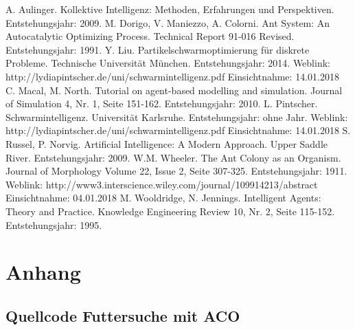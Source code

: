 \documentclass[a4paper, 11pt]{article}
\makeatletter
\newcommand*{\appendixtoc}{
	\begingroup
	\edef\@alltocdepth{\the\value{tocdepth}}
	\setcounter{tocdepth}{-10000}
	\renewcommand*{\contentsname}{
		Verzeichnis der Anh\"ange}
	\renewcommand*{\appendixattoc}{
		\setcounter{tocdepth}{\@alltocdepth}
	}
	\tableofcontents
	\setcounter{tocdepth}{\@alltocdepth}
	\endgroup
}
\newcommand*{\appendixattoc}{
}
\makeatother
\begin{document}
\newpage
\begin{thebibliography}{sotief}
	A. Aulinger. Kollektive Intelligenz: Methoden, Erfahrungen und Perspektiven. Entstehungsjahr: 2009.
	M. Dorigo, V. Maniezzo, A. Colorni. Ant System: An Autocatalytic Optimizing Process. Technical Report 91-016 Revised.  Entstehungsjahr: 1991.
	Y. Liu. Partikelschwarmoptimierung für diskrete Probleme. Technische Universität München. Entstehungsjahr: 2014.\newline\newline
	Weblink: http://lydiapintscher.de/uni/schwarmintelligenz.pdf \newline Einsichtnahme: 14.01.2018
	C. Macal, M. North. Tutorial on agent-based modelling and simulation. Journal of Simulation 4, Nr. 1, Seite 151-162. Entstehungsjahr: 2010.
	L. Pintscher. Schwarmintelligenz. Universität Karlsruhe. Entstehungsjahr: ohne Jahr.\newline\newline
	Weblink: http://lydiapintscher.de/uni/schwarmintelligenz.pdf \newline Einsichtnahme: 14.01.2018
	S. Russel, P. Norvig. Artificial Intelligence: A Modern Approach. Upper Saddle River. Entstehungsjahr: 2009.
	W.M. Wheeler. The Ant Colony as an Organism. Journal of Morphology Volume 22, Issue 2, Seite 307-325. Entstehungsjahr: 1911.\newline\newline
	Weblink: http://www3.interscience.wiley.com/journal/109914213/abstract \newline Einsichtnahme: 04.01.2018
	M. Wooldridge, N. Jennings. Intelligent Agents: Theory and Practice. Knowledge Engineering Review 10, Nr. 2, Seite 115-152. Entstehungsjahr: 1995.

	
\end{thebibliography}
\newpage
\appendixtoc
\newpage
\section{Anhang}
\subsection{Quellcode Futtersuche mit \acs{ACO}}
\end{document}
